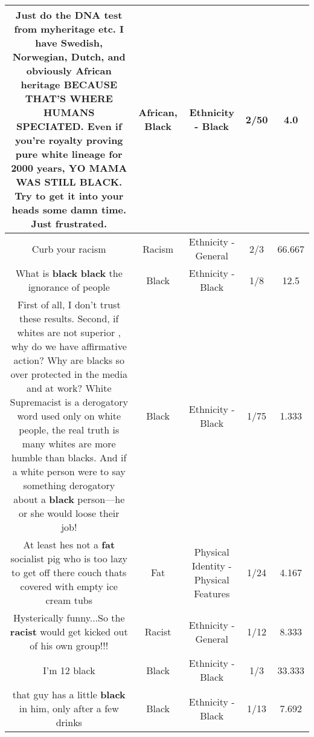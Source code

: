 \documentclass[11pt]{article}
\newlength\mylength
\begin{document}
\begin{center}
\begin{longtable}{|C{.65\mylength}|C{.30\mylength}|C{.12\mylength}|C{.12\mylength}|C{.12\mylength}|}
  \small Just do the DNA test from myheritage etc. I have Swedish, Norwegian, Dutch, and obviously \textbf{African} heritage BECAUSE THAT'S WHERE HUMANS SPECIATED. Even if you're royalty proving pure white lineage for 2000 years, YO MAMA WAS STILL \textbf{BLACK}. Try to get it into your heads some damn time. Just frustrated.\normalsize   & African, Black & Ethnicity - Black & 2/50 & 4.0 \\  \hline
  \small Curb your racism\normalsize   & Racism & Ethnicity - General & 2/3 & 66.667 \\  \hline
  \small What is \textbf{black} \textbf{black} the ignorance of people\normalsize   & Black & Ethnicity - Black & 1/8 & 12.5 \\  \hline
  \small First of all,  I don't trust these results.  Second,  if whites are not superior ,  why do we have affirmative action?   Why are blacks so over protected in the media and at work?   White Supremacist is a derogatory word used only on white people,  the real truth is many whites are more humble than blacks.  And if a white person were to say something derogatory about a \textbf{black} person---he or she would loose their job!\normalsize   & Black & Ethnicity - Black & 1/75 & 1.333 \\  \hline
  \small At least hes not a \textbf{fat} socialist pig who is too lazy to get off there couch thats covered with empty ice cream tubs\normalsize   & Fat & Physical Identity - Physical Features & 1/24 & 4.167 \\  \hline
  \small Hysterically funny...So the \textbf{racist} would get kicked out of his own group!!!\normalsize   & Racist & Ethnicity - General & 1/12 & 8.333 \\  \hline
  \small I'm 12 black\normalsize   & Black & Ethnicity - Black & 1/3 & 33.333 \\  \hline
  \small that guy has a little \textbf{black} in him, only after a few drinks\normalsize   & Black & Ethnicity - Black & 1/13 & 7.692 \\  \hline

\end{longtable}
\end{center}
\end{document}

